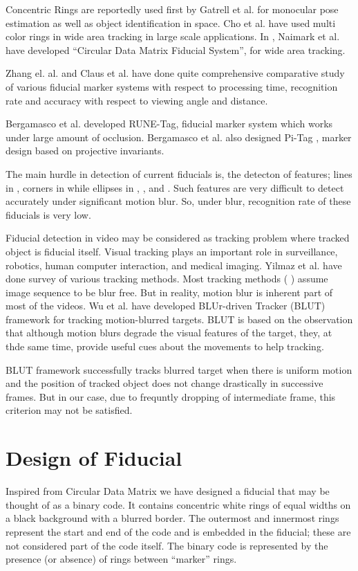 \documentclass[runningheads]{llncs}
\begin{document}
Concentric Rings are reportedly used first by Gatrell et al.\cite{concentric}
for monocular pose estimation as well as object identification in space. Cho et al.
\cite{Cho:2001}\cite{Cho97fastcolor} have used multi color rings in wide area
tracking in large scale applications. In \cite{NaimarkF02}, Naimark et al.
have developed ``Circular Data Matrix Fiducial System'', for wide area tracking.

Zhang el. al.\cite{Zhang:2002} and Claus et al. \cite{ClausF04} have done
quite comprehensive comparative study of various fiducial marker systems with
respect to processing time, recognition rate and accuracy with
respect to viewing angle and distance.

Bergamasco et al. \cite{runetag11} developed RUNE-Tag, fiducial marker
system which works under large amount of occlusion. Bergamasco et al. also 
designed Pi-Tag \cite{Pitag13}, marker design based on projective
invariants.

The main hurdle in detection of current fiducials is, the detecton of features;
lines in \cite{ARToolkit02}, corners in \cite{Fiala05} while ellipses in
\cite{Cho:2001}, \cite{Cho97fastcolor}, \cite{runetag11} and \cite{Pitag13}.
Such features are very difficult to detect accurately under significant motion
blur. So, under blur, recognition rate of these fiducials is very low. 

Fiducial detection in video may be considered as tracking problem where tracked
object is fiducial itself. Visual tracking plays an important role in
surveillance, robotics, human computer interaction, and medical
imaging\cite{Yilmaz:2006}. Yilmaz et al.\cite{Yilmaz:2006} have done survey of
various tracking methods. Most tracking methods
( \cite{Ross:2008} \cite{Wu:2009} \cite{Perez02} \cite{Mei:2009} ) assume image
sequence to be blur free. But in reality, motion blur is inherent part of most
of the videos. Wu et al.\cite{Wu:2011} have developed BLUr-driven Tracker (BLUT)
framework for tracking motion-blurred targets. BLUT is based on the observation
that although motion blurs degrade the visual features of the target, they, at
thde same time, provide useful cues about the movements to help tracking.
 
BLUT framework successfully tracks blurred target when there is uniform motion
and the position of tracked object does not change drastically in successive
frames. But in our case, due to frequntly dropping of intermediate frame, this
criterion may not be satisfied.
 
\section{Design of Fiducial}
Inspired from Circular Data Matrix\cite{NaimarkF02} we have designed a fiducial
that may be thought of as a binary code.  It contains concentric white rings of
equal widths on a black background with a blurred border. The outermost and
innermost rings represent the start and end of the code and is embedded in the
fiducial; these are not considered part of the code itself. The binary code is
represented by the presence (or absence) of rings between ``marker'' rings.
\end{document}
